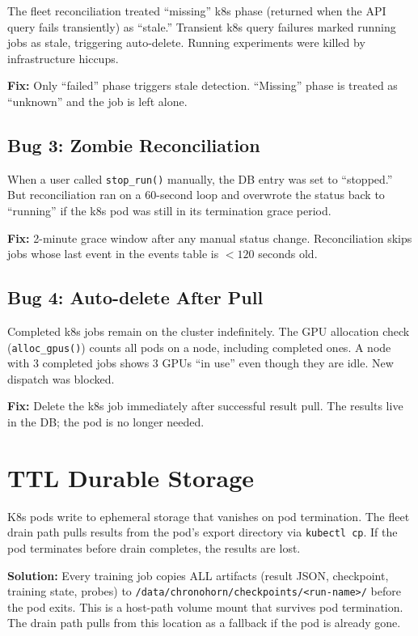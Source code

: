 \documentclass[11pt,a4paper]{report}
\begin{document}
The fleet reconciliation treated ``missing'' k8s phase (returned when the API query fails transiently) as ``stale.'' Transient k8s query failures marked running jobs as stale, triggering auto-delete. Running experiments were killed by infrastructure hiccups.

\textbf{Fix:} Only ``failed'' phase triggers stale detection. ``Missing'' phase is treated as ``unknown'' and the job is left alone.

\subsection{Bug 3: Zombie Reconciliation}

When a user called \texttt{stop\_run()} manually, the DB entry was set to ``stopped.'' But reconciliation ran on a 60-second loop and overwrote the status back to ``running'' if the k8s pod was still in its termination grace period.

\textbf{Fix:} 2-minute grace window after any manual status change. Reconciliation skips jobs whose last event in the events table is $< 120$ seconds old.

\subsection{Bug 4: Auto-delete After Pull}

Completed k8s jobs remain on the cluster indefinitely. The GPU allocation check (\texttt{alloc\_gpus()}) counts all pods on a node, including completed ones. A node with 3 completed jobs shows 3 GPUs ``in use'' even though they are idle. New dispatch was blocked.

\textbf{Fix:} Delete the k8s job immediately after successful result pull. The results live in the DB; the pod is no longer needed.

\section{TTL Durable Storage}

K8s pods write to ephemeral storage that vanishes on pod termination. The fleet drain path pulls results from the pod's export directory via \texttt{kubectl cp}. If the pod terminates before drain completes, the results are lost.

\textbf{Solution:} Every training job copies ALL artifacts (result JSON, checkpoint, training state, probes) to \texttt{/data/chronohorn/checkpoints/<run-name>/} before the pod exits. This is a host-path volume mount that survives pod termination. The drain path pulls from this location as a fallback if the pod is already gone.
\end{document}
